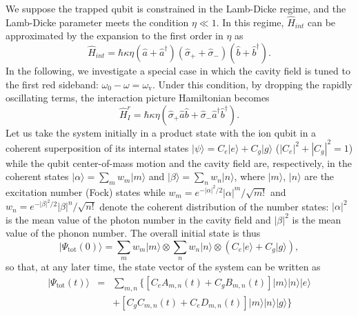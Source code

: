 \documentclass[twocolumn,3p,times]{elsarticle}
\newcommand{\ket}[1]{|#1\rangle}
\begin{document}
We suppose the trapped qubit is constrained in the Lamb-Dicke regime, and the Lamb-Dicke parameter meets the condition $\eta\ll1$. In this regime, $\hat{H}_{int}$ can be approximated by the expansion to the first order in $\eta$ as
\begin{equation} 
\label{eq:2}  
\hat{H}_{int}=\hbar \kappa \eta (\hat{a}+\hat{a}^{\dagger})(\hat{\sigma}_{+}+\hat{\sigma}_{-})(\hat{b}+\hat{b}^{\dagger}).
\end{equation}
In the following, we investigate a special case in which the cavity field is tuned to the first red sideband: $\omega_{0}-\omega=\omega_\mathrm{v}$. Under this condition, by dropping the rapidly oscillating terms, the interaction picture Hamiltonian becomes
\begin{equation} 
\label{eq:3}  
\hat{H}_{I}^{r}=\hbar \kappa \eta(\hat{\sigma}_{+}\hat a\hat b+\hat{\sigma}_{-}\hat{a}^{\dagger}\hat{b}^{\dagger}).
\end{equation}
Let us take the system initially in a product state with the ion qubit in a coherent superposition of its internal states $\ket{\psi}=C_{e}\lvert e\rangle+C_{g}\lvert g\rangle$ ($\left|C_{e} \right|^{2}+\left|C_{g} \right|^{2}=1$) while the qubit center-of-mass motion and the cavity field are, respectively, in the coherent states $\ket{\alpha}=\sum_{m}w_{m}\lvert m\rangle $ and $\ket{\beta}=\sum_{n}w_{n}\lvert n\rangle$, where $\lvert m \rangle$, $\lvert n \rangle$ are the excitation number (Fock) states while $w_{m}=e^{-\lvert\alpha\rvert^{2}/2}\lvert\alpha\rvert^{m}/\sqrt{m!}$ and $w_{n}=e^{-\lvert\beta\rvert^{2}/2}\lvert\beta\rvert^{n}/\sqrt{n!}$ denote the coherent distribution of the number states: $\lvert\alpha\rvert^{2}$ is the mean value of the photon number in the cavity field and $\lvert\beta\rvert^{2}$ is the mean value of the phonon number. The overall initial state is thus
\begin{equation} 
\label{eq:4}  
\lvert\Psi_\mathrm{tot}(0)\rangle=\sum_{m}w_{m}\lvert m\rangle\otimes\sum_{n}w_{n}\lvert n\rangle\otimes
(C_{e}\lvert e\rangle+C_{g}\lvert g\rangle),
\end{equation} 
so that, at any later time, the state vector of the system can be written as
\setlength\arraycolsep{1.4pt}\begin{eqnarray}
\label{eq:5} 
\lvert\Psi_\mathrm{tot}(t)\rangle &=& \sum_{m,n}\{[C_{e}A_{m,n}(t)+C_{g}B_{m,n}(t)]\lvert m \rangle\lvert n\rangle\lvert e\rangle \nonumber \\
&&+[C_{g}C_{m,n}(t)+C_{e}D_{m,n}(t)]\lvert m\rangle\lvert n\rangle\lvert g\rangle\}
\end{eqnarray} 
\end{document}
